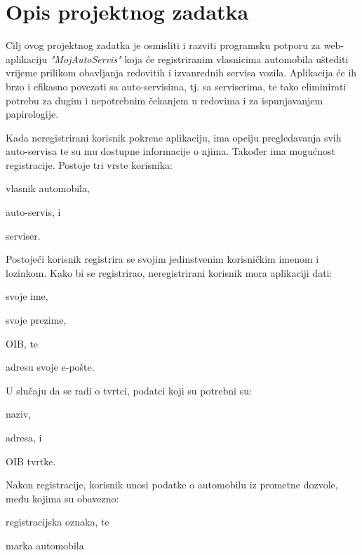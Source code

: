 \chapter{Opis projektnog zadatka}
		
		

		Cilj ovog projektnog zadatka je osmisliti i razviti programsku potporu za web-aplikaciju \textit{"MojAutoServis"} koja će registriranim vlasnicima automobila uštediti vrijeme prilikom obavljanja redovitih i izvanrednih servisa vozila. Aplikacija će ih brzo i efikasno povezati sa auto-servisima, tj. sa serviserima, te tako eliminirati potrebu za dugim i nepotrebnim čekanjem u redovima i za ispunjavanjem papirologije.
		
		
		
		
		Kada neregistrirani korisnik pokrene aplikaciju, ima opciju pregledavanja svih auto-servisa te su mu dostupne informacije o njima. Također ima mogućnost registracije.
		Postoje tri vrste korisnika:
		\begin{packed_item}
			\item vlasnik automobila,
			\item auto-servis, i
			\item serviser.
		\end{packed_item}
		
		
		 Postojeći korisnik registrira se svojim jedinstvenim korisničkim imenom i lozinkom. Kako bi se registrirao, neregistrirani korisnik mora aplikaciji dati:
		\begin{packed_item}
			\item svoje ime,
			\item svoje prezime,
			\item OIB, te
			\item adresu svoje e-pošte.
		\end{packed_item}
		
		U slučaju da se radi o tvrtci, podatci koji su potrebni su:
		\begin{packed_item}
			\item naziv,
			\item adresa, i
			\item OIB tvrtke.
		\end{packed_item}
		
		Nakon registracije, korisnik unosi podatke o automobilu iz prometne dozvole, među kojima su obavezno:
		\begin{packed_item}
			\item registracijska oznaka, te
			\item marka automobila
		\end{packed_item}
		
